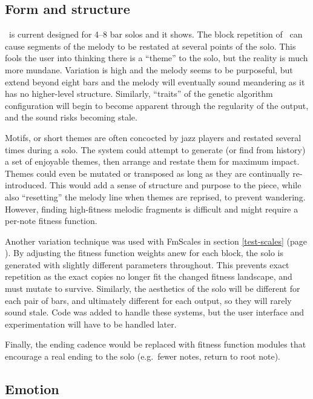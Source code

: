 \subsection{Form and structure}

\jg\ is current designed for 4--8 bar solos and it shows. The block repetition of \jg\ can cause segments of the melody to be restated at several points of the solo. This fools the user into thinking there is a ``theme'' to the solo, but the reality is much more mundane.  Variation is high and the melody seems to be purposeful, but extend beyond eight bars and the melody will eventually sound meandering as it has no higher-level structure. Similarly, ``traits'' of the genetic algorithm configuration will begin to become apparent through the regularity of the output, and the sound risks becoming stale.

Motifs, or short themes are often concocted by jazz players and restated several times during a solo. The system could attempt to generate (or find from history) a set of enjoyable themes, then arrange and restate them for maximum impact. Themes could even be mutated or transposed as long as they are continually re-introduced. This would add a sense of structure and purpose to the piece, while also ``resetting'' the melody line when themes are reprised, to prevent wandering. However, finding high-fitness melodic fragments is difficult and might require a per-note fitness function.

Another variation technique was used with FmScales in section \ref{test-scales} (page \pageref{test-scales}). By adjusting the fitness function weights anew for each block, the solo is generated with slightly different parameters throughout. This prevents exact repetition as the exact copies no longer fit the changed fitness landscape, and must mutate to survive. Similarly, the aesthetics of the solo will be different for each pair of bars, and ultimately different for each output, so they will rarely sound stale. Code was added to handle these systems, but the user interface and experimentation will have to be handled later.

Finally, the ending cadence would be replaced with fitness function modules that encourage a real ending to the solo (e.g.\ fewer notes, return to root note).

\subsection{Emotion}

